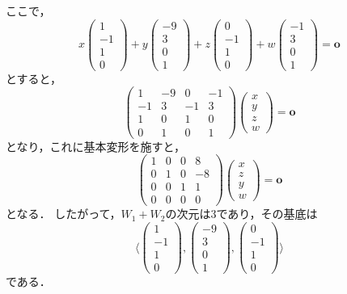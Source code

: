 \documentclass[a4paper,10pt,fleqn]{ltjsarticle}
\begin{document}
\begin{tleftbar}
    ここで，
    \[
        x \begin{pmatrix} 1 \\ -1 \\ 1 \\ 0 \end{pmatrix} + y \begin{pmatrix} -9 \\ 3 \\ 0 \\ 1 \end{pmatrix} + z \begin{pmatrix} 0 \\ -1 \\ 1 \\ 0 \end{pmatrix} + w \begin{pmatrix} -1 \\ 3 \\ 0 \\ 1 \end{pmatrix} =\bm{o}
    \]
    とすると，
    \[
        \begin{pmatrix} 1 & -9 & 0 & -1 \\ -1 & 3 & -1 & 3 \\ 1 & 0 & 1 & 0 \\ 0 & 1 & 0 & 1 \end{pmatrix} \begin{pmatrix} x \\ y \\ z \\ w \end{pmatrix} = \bm{o}
    \]
    となり，これに基本変形を施すと，
    \[
        \begin{pmatrix} 1 & 0 & 0 & 8 \\ 0 & 1 & 0 & -8 \\0 & 0 & 1 & 1 \\ 0 & 0 & 0 & 0 \end{pmatrix} \begin{pmatrix} x \\ z \\ y \\ w \end{pmatrix} = \bm{o}
    \]
    となる．
    したがって，$W_1 + W_2$の次元は$3$であり，その基底は
    \[
        \langle \begin{pmatrix} 1 \\ -1 \\ 1 \\ 0 \end{pmatrix} , \begin{pmatrix} -9 \\ 3 \\ 0 \\ 1 \end{pmatrix} , \begin{pmatrix} 0 \\ -1 \\ 1 \\ 0 \end{pmatrix} \rangle
    \]
    である．
\end{tleftbar}
\end{document}
